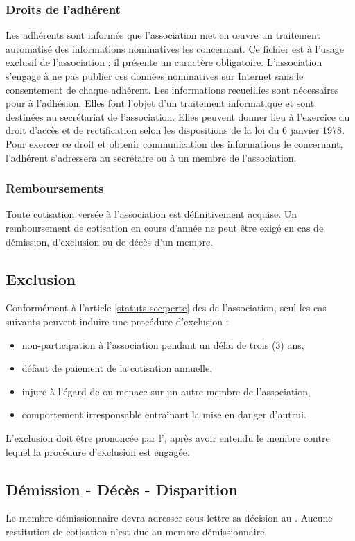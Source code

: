 \documentclass[a4paper,french,10pt]{article}
\newcommand{\article}[1]{\subsection{#1}\addtocounter{article}{1}}
\newcounter{article}
\newcommand{\artrefst}[1]{article \ref{statuts-#1} des \statuts{}}
\begin{document}
\subsubsection*{Droits de l'adhérent}
Les adhérents sont informés que l’association met en œuvre un traitement automatisé des informations nominatives les concernant.
Ce fichier est à l’usage exclusif de l’association ; il présente un caractère obligatoire. L’association s’engage à ne pas publier ces données nominatives sur Internet sans le consentement de chaque adhérent.
Les informations recueillies sont nécessaires pour à l’adhésion. Elles font l'objet d'un traitement informatique et sont destinées au secrétariat de l’association. Elles peuvent donner lieu à l'exercice du droit d'accès et de rectification selon les dispositions de la loi du 6 janvier 1978. Pour exercer ce droit et obtenir communication des informations le concernant, l’adhérent s’adressera au secrétaire ou à un membre de l'association.

\subsubsection*{Remboursements}

Toute cotisation versée à l'association est définitivement acquise. Un remboursement de cotisation en cours d'année ne peut être exigé en cas de démission, d'exclusion ou de décès d'un membre.

\article{Exclusion}
\label{sec:exclusion}

Conformément à l'\artrefst{sec:perte} de l'association, seul les cas suivants  peuvent induire une procédure d'exclusion :
\begin{itemize}
\item non-participation à l'association pendant un délai de trois (3) ans,
\item défaut de paiement de la cotisation annuelle,
\item injure à l'égard de ou menace sur un autre membre de l'association,
\item comportement irresponsable entraînant la mise en danger d'autrui.
\end{itemize}

L'exclusion doit être prononcée par l'\AG{}, après avoir entendu le membre contre lequel la procédure d'exclusion est engagée.

\article{Démission - Décès - Disparition}
\label{sec:demiss-deces-disp}
Le membre démissionnaire devra adresser sous lettre sa décision au \bureau{}.
Aucune restitution de cotisation n'est due au membre démissionnaire.
\end{document}
